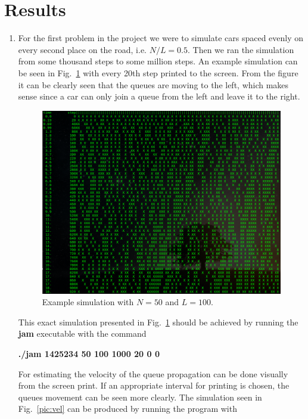 \documentclass[a4paper,12pt]{article}
\begin{document}
\section{Results}
\begin{enumerate}
\item

For the first problem in the project we were to simulate cars spaced evenly on every second place on the road, i.e. $N/L=0.5$. Then we ran the simulation from some thousand steps to some million steps. An example simulation can be seen in Fig.~\ref{pic:road1} with every 20th step printed to the screen. From the figure it can be clearly seen that the queues are moving to the left, which makes sense since a car can only join a queue from the left and leave it to the right.

\begin{figure}[h]
\centering
\includegraphics[width=\columnwidth]{road2.png}
\caption{Example simulation with $N=50$ and $L=100$.}
\label{pic:road1}
\end{figure}

This exact simulation presented in Fig.~\ref{pic:road1} should be achieved by running the {\bf{jam}} executable with the command

{\bf{./jam 1425234 50 100 1000 20 0 0}}

For estimating the velocity of the queue propagation can be done visually from the screen print. If an appropriate interval for printing is chosen, the queues movement can be seen more clearly. The simulation seen in Fig.~\ref{pic:vel} can be produced by running the program with


\end{enumerate}
\end{document}
